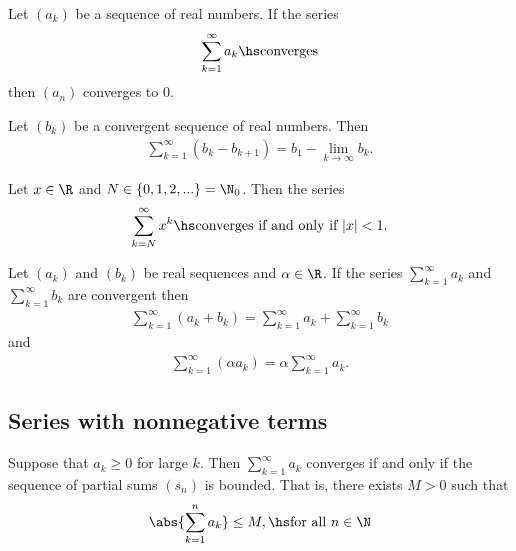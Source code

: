 \documentclass{article}
\begin{document}
\begin{theorem}
    Let $(a_k)$ be a sequence of real numbers. If the series
    \begin{align*}
        \sum_{k=1}^\infty a_k\hs\text{converges}
    \end{align*}
    then $(a_n)$ converges to $0$. 
\end{theorem}

\begin{theorem}
    Let $(b_k)$ be a convergent sequence of real numbers. Then
    \begin{align*}
        \sum_{k=1}^\infty (b_k - b_{k+1})=b_1-\lim_{k\to\infty}b_k. 
    \end{align*}
\end{theorem}

\setcounter{theorem}{10}
\begin{theorem}
    Let $x\in\R$ and $N\in\{0,1,2,...\}=\N_0$. Then the series
    \begin{align*}
        \sum_{k=N}^\infty x^k\hs\text{converges if and only if }|x|<1.
    \end{align*} 
\end{theorem}

\begin{theorem}
    Let $(a_k)$ and $(b_k)$ be real sequences and $\alpha\in\R$. If the
    series $\sum_{k=1}^\infty a_k$ and $\sum_{k=1}^\infty b_k$ are convergent
    then
    \begin{align*}
        \sum_{k=1}^\infty (a_k+b_k)=\sum_{k=1}^\infty a_k + \sum_{k=1}^\infty b_k
    \end{align*}
    and
    \begin{align*}
        \sum_{k=1}^\infty (\alpha a_k)=\alpha \sum_{k=1}^\infty a_k.
    \end{align*}
\end{theorem}

\subsection{Series with nonnegative terms}

\begin{theorem}
    Suppose that $a_k\geq 0$ for large $k$. Then $\sum_{k=1}^\infty a_k$ converges
    if and only if the sequence of partial sums $(s_n)$ is bounded. That is,
    there exists $M>0$ such that
    \begin{align*}
        \abs{\sum_{k=1}^na_k}\leq M,\hs\text{for all }n\in\N
    \end{align*}
\end{theorem}
\end{document}
